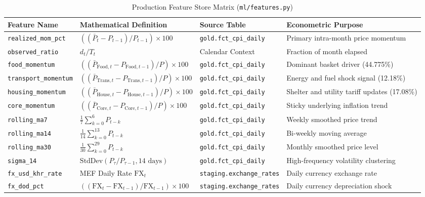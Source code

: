 \documentclass[11pt,a4paper]{article}
\begin{document}
\begin{table}[htbp]
\centering
\scriptsize
\caption{Production Feature Store Matrix (\texttt{ml/features.py})}
\vspace{4pt}
\begin{tabularx}{\textwidth}{lllX}
\toprule
\textbf{Feature Name} & \textbf{Mathematical Definition} & \textbf{Source Table} & \textbf{Econometric Purpose} \\
\midrule
\texttt{realized\_mom\_pct} & $(( \bar{P}_t - P_{t-1} ) / P_{t-1}) \times 100$ & \texttt{gold.fct\_cpi\_daily} & Primary intra-month price momentum \\
\texttt{observed\_ratio} & $d_t / T_t$ & Calendar Context & Fraction of month elapsed \\
\texttt{food\_momentum} & $(( \bar{P}_{\text{Food}, t} - P_{\text{Food}, t-1} ) / P) \times 100$ & \texttt{gold.fct\_cpi\_daily} & Dominant basket driver (44.775\%) \\
\texttt{transport\_momentum} & $(( \bar{P}_{\text{Trans}, t} - P_{\text{Trans}, t-1} ) / P) \times 100$ & \texttt{gold.fct\_cpi\_daily} & Energy and fuel shock signal (12.18\%) \\
\texttt{housing\_momentum} & $(( \bar{P}_{\text{House}, t} - P_{\text{House}, t-1} ) / P) \times 100$ & \texttt{gold.fct\_cpi\_daily} & Shelter and utility tariff updates (17.08\%) \\
\texttt{core\_momentum} & $(( \bar{P}_{\text{Core}, t} - P_{\text{Core}, t-1} ) / P) \times 100$ & \texttt{gold.fct\_cpi\_daily} & Sticky underlying inflation trend \\
\texttt{rolling\_ma7} & $\frac{1}{7} \sum_{k=0}^{6} P_{t-k}$ & \texttt{gold.fct\_cpi\_daily} & Weekly smoothed price trend \\
\texttt{rolling\_ma14} & $\frac{1}{14} \sum_{k=0}^{13} P_{t-k}$ & \texttt{gold.fct\_cpi\_daily} & Bi-weekly moving average \\
\texttt{rolling\_ma30} & $\frac{1}{30} \sum_{k=0}^{29} P_{t-k}$ & \texttt{gold.fct\_cpi\_daily} & Monthly smoothed price level \\
\texttt{sigma\_14} & $\text{StdDev}(P_\tau / P_{\tau-1}, 14\text{ days})$ & \texttt{gold.fct\_cpi\_daily} & High-frequency volatility clustering \\
\texttt{fx\_usd\_khr\_rate} & MEF Daily Rate $\text{FX}_t$ & \texttt{staging.exchange\_rates} & Daily currency exchange rate \\
\texttt{fx\_dod\_pct} & $(( \text{FX}_t - \text{FX}_{t-1} ) / \text{FX}_{t-1}) \times 100$ & \texttt{staging.exchange\_rates} & Daily currency depreciation shock \\

\end{tabularx}
\end{table}
\end{document}
